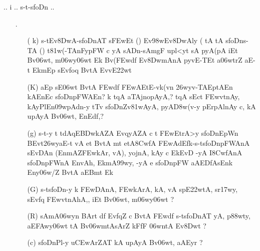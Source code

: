 \begin{center}
{\dn\dnbf .. i .. s\2-t{\rs -\re}s\2foDn ..}
\end{center}

\begin{itemize}

\item[{\dn \dnnum \rn{23}}.] \begin{itemize}
           
           \item[( {\dn k})] {\dn s\2-tEv\38DwA{\rs -\re}s\2foDnAT{\rdt} s\2\3FEwEt {\rs (\re}{\dn \dnnum {}}{\rs )\re} Ev\398wEv\38DwAly\? {\rs (\re}{\dn\dnnum {}} tA tA s\2foDns\2-TA {\rs (\re}{\dn\dnnum {}}{\rs )\re} t\381w(-TAnFy\-pFW\? c yA sADn{\rs -\re}sAmg\5F upl<yt\?{\rs ,\re} sA pyA\0(pA iEt Bv\306wt, m\306wy\306wt\? Ek Bv(\3FEwd\?f\? Ev\38DwmAnA\2 py\0vE-TEt a\306wtr\?Z aE-t EkmEp sEvfoq\2 BvtA\2 EvvE\322wt} 

           \item[({\dn K})] {\dn aEp sE\306wt BvtA\2 \3FEwd\?f\? \3FEwAEtE-vk(v\?n \326wyv-TAEptAEn kAEnEc s\2foDnpFWAEn{\rs ?\re} k\? t\?qA aTA\0j\0no\-pAyA,{\rs ?\re} t\?qA\2 sEct\2 \3FEwvt\0nAy{\rs ,\re} kAy\0PlEn\309wpAd\-n-y tT\4v s\2foDnZv\381wAyA, pyA\0\3D8w(v-y pErpAlnAy c{\rs ,\re} kA upAyA Bv\306wt, EnEd\0f\?,{\rs ?\re}}
           
           \item[({\dn g})] {\dn s\2-t-y t\? tdAqE\3BDwkAZA\2 EvqyAZA\2 c t\? \3FEwEtrA>y\2 s\2foDnEpW\?n BEvt\326wyaE-t vA et BvtA\2 mt etA\38CwfA\2  \3FEwAd\?Efk{\rs -\re}s\2-ts\2foDnpFWAnA\2 s\2EvDAn\2 {\rs (\re}EnmA\0Z\3FEwkAr, vA{\rs ),\re} yojnA{\rs ,\re} kAy{\rdt} c Ek\2EvD\2 -yA I\38CwfAnA\2 s\2foDnpFWnA\2 EnvA\0h, EkmA\399wy, -yA e s\2foDnpFW\? aAEDfAsEnk\2 Eny\306w/Z\2 BvtA aEBmt\2 Ek}

          \item[({\dn G})] {\dn s\2-ts\2foDn-y k\? \3FEwDAnA, \3FEwkArA, kA, vA sp\?E\322wtA, sr\317wy, sEvf\?q\2 \3FEwvt\0nAhA\0,{\rs ,\re} iEt Bv\306wt, m\306wy\306wt\? {\rs ?\re}}
          
          \item[({\dn R})] {\dn sAmA\306wy\?n BArt\? d\?f\?{\rs ,\re} Evf\?q\?Z c BvtA\2 \3FEwd\?f\?{\rs ,\re} s\2-ts\2foDnAT{\rdt} yA, p\388wty, aE\3FAwy\306wt\?{\rs ,\re} tA Bv\306wmtAsAr\?Z kFfF \306wntA Ev\38Dwt\? {\rs ?\re}}
          
          \item[({\dn c})] {\dn s\2foDnPl-y u\3CEwArZAT{\rdt} kA upAyA Bv\306wt, aAEy\?r {\rs ?\re}}
          
          \end{itemize}
\end{itemize}

